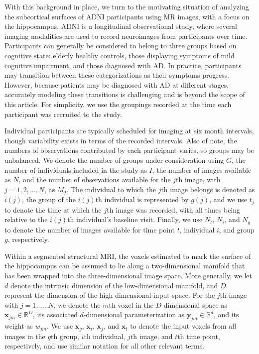 \documentclass[11pt,reqno]{article}
\theoremstyle{definition}
\begin{document}
With this background in place, we turn to the motivating situation of analyzing the subcortical surfaces of ADNI participants using MR images, with a focus on the hippocampus. ADNI is a longitudinal observational study, where several imaging modalities are used to record neuroimages from participants over time. Participants can generally be considered to belong to three groups based on cognitive state: elderly healthy controls, those displaying symptoms of mild cognitive impairment, and those diagnosed with AD. In practice, participants may transition between these categorizations as their symptoms progress. However, because patients may be diagnosed with AD at different stages, accurately modeling these transitions is challenging and is beyond the scope of this article. For simplicity, we use the groupings recorded at the time each participant was recruited to the study. 

Individual participants are typically scheduled for imaging at six month intervals, though variability exists in terms of the recorded intervals. Also of note, the numbers of observations contributed by each participant varies, so groups may be unbalanced. We denote the number of groups under consideration using $G$, the number of individuals included in the study as $I$, the number of images available as $N$, and the number of observations available for the $j$th image, with $j = 1, 2, \dots, N$, as $M_j$. The individual to which the $j$th image belongs is denoted as $i(j)$, the group of the $i(j)$th individual is represented by $g(j)$, and we use $t_j$ to denote the time at which the $j$th image was recorded, with all times being relative to the $i(j)$th individual's baseline visit. Finally, we use $N_t$, $N_i$, and $N_g$ to denote the number of images available for time point $t$, individual $i$, and group $g$, respectively.

Within a segmented structural MRI, the voxels estimated to mark the surface of the hippocampus can be assumed to lie along a two-dimensional manifold that has been wrapped into the three-dimensional image space. More generally, we let $d$ denote the intrinsic dimension of the low-dimensional manifold, and $D$ represent the dimension of the high-dimensional input space. For the $j$th image with $j = 1, \dots, N$, we denote the $m$th voxel in the $D$-dimensional space as $\mathbf{x}_{jm} \in \mathbb{R}^{D}$, its associated $d$-dimensional parameterization as $\mathbf{y}_{jm} \in \mathbb{R}^{d}$, and its weight as $w_{jm}$. We use $\mathbf{x}_g$, $\mathbf{x}_i$, $\mathbf{x}_{j}$, and $\mathbf{x}_t$ to denote the input voxels from all images in the $g$th group, $i$th individual, $j$th image, and $t$th time point, respectively, and use similar notation for all other relevant terms.
\end{document}
